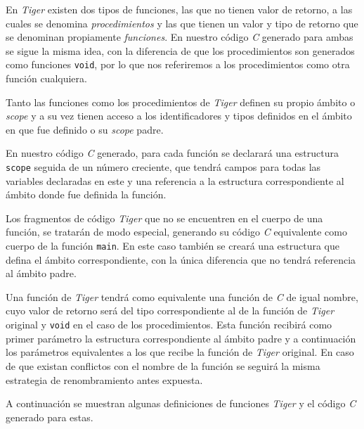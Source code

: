 \documentclass{article}
\begin{document}
En \textit{Tiger} existen dos tipos de funciones, las que no tienen valor de
retorno, a las cuales se denomina \textit{procedimientos} y las que tienen un
valor y tipo de retorno que se denominan propiamente \textit{funciones}. En
nuestro código \textit{C} generado para ambas se sigue la misma idea, con la
diferencia de que los procedimientos son generados como funciones
\texttt{void}, por lo que nos referiremos a los procedimientos como otra
función cualquiera.

Tanto las funciones como los procedimientos de \textit{Tiger} definen su propio
ámbito o \textit{scope} y a su vez tienen acceso a los identificadores y tipos
definidos en el ámbito en que fue definido o su \textit{scope} padre.

En nuestro código \textit{C} generado, para cada función se declarará una
estructura \texttt{scope} seguida de un número creciente, que tendrá campos para
todas las variables declaradas en este y una referencia a la estructura
correspondiente al ámbito donde fue definida la función.

Los fragmentos de código \textit{Tiger} que no se encuentren en el
cuerpo de una función, se tratarán de modo especial, generando su
código \textit{C} equivalente como cuerpo de la función \texttt{main}. En este
caso también se creará una estructura que defina el ámbito correspondiente,
con la única diferencia que no tendrá referencia al ámbito padre.

Una función de \textit{Tiger} tendrá como equivalente una función de \textit{C}
de igual nombre, cuyo valor de retorno será del tipo correspondiente al de la
función de \textit{Tiger} original y \texttt{void} en el caso de los
procedimientos. Esta función recibirá como primer parámetro la estructura
correspondiente al ámbito padre y a continuación los parámetros equivalentes a
los que recibe la función de \textit{Tiger} original. En caso de que existan
conflictos con el nombre de la función se seguirá la misma estrategia de
renombramiento antes expuesta.

A continuación se muestran algunas definiciones de funciones \emph{Tiger} y el
código \emph{C} generado para estas.
\end{document}
